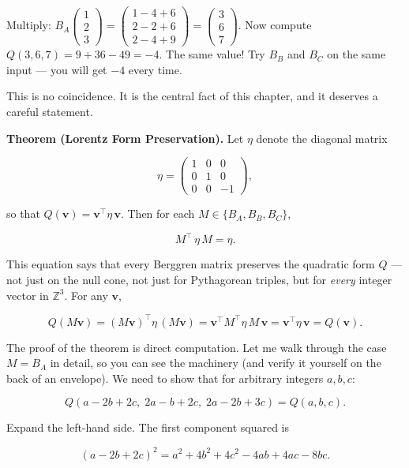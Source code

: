 Multiply: \(B_A \begin{pmatrix} 1 \\ 2 \\ 3 \end{pmatrix} = \begin{pmatrix} 1 - 4 + 6 \\ 2 - 2 + 6 \\ 2 - 4 + 9 \end{pmatrix} = \begin{pmatrix} 3 \\ 6 \\ 7 \end{pmatrix}.\) Now compute \(Q(3, 6, 7) = 9 + 36 - 49 = -4.\) The same value! Try \(B_B\) and \(B_C\) on the same input --- you will get \(-4\) every time.

This is no coincidence. It is the central fact of this chapter, and it deserves a careful statement.

\textbf{Theorem (Lorentz Form Preservation).} Let \(\eta\) denote the diagonal matrix

\[\eta = \begin{pmatrix} 1 & 0 & 0 \\ 0 & 1 & 0 \\ 0 & 0 & -1 \end{pmatrix},\]

so that \(Q(\mathbf{v}) = \mathbf{v}^\top \eta\, \mathbf{v}\). Then for each \(M \in \{B_A, B_B, B_C\}\),

\[M^{\!\top}\, \eta\, M = \eta.\]

This equation says that every Berggren matrix preserves the quadratic form \(Q\) --- not just on the null cone, not just for Pythagorean triples, but for \emph{every} integer vector in \(\mathbb{Z}^3\). For any \(\mathbf{v}\),

\[Q(M\mathbf{v}) = (M\mathbf{v})^\top \eta\, (M\mathbf{v}) = \mathbf{v}^\top M^\top \eta\, M\, \mathbf{v} = \mathbf{v}^\top \eta\, \mathbf{v} = Q(\mathbf{v}).\]

The proof of the theorem is direct computation. Let me walk through the case \(M = B_A\) in detail, so you can see the machinery (and verify it yourself on the back of an envelope). We need to show that for arbitrary integers \(a, b, c\):

\[Q(a - 2b + 2c,\; 2a - b + 2c,\; 2a - 2b + 3c) = Q(a, b, c).\]

Expand the left-hand side. The first component squared is

\[(a - 2b + 2c)^2 = a^2 + 4b^2 + 4c^2 - 4ab + 4ac - 8bc.\]

